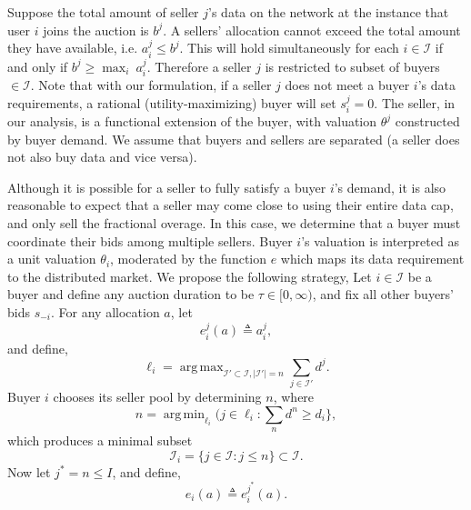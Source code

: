 \documentclass[12pt]{article}
\theoremstyle{definition}
\newcommand{\vs}{\varsigma}
\newcommand{\mcI}{\mathcal{I}}
\DeclareMathOperator*{\argmax}{arg\,max}
\DeclareMathOperator*{\argmin}{arg\,min}
\begin{document}
\begin{multicols}{2}
Suppose the total amount of seller $j$'s data on the network at the instance that
user $i$ joins the auction is $b^j$. 
A sellers' allocation cannot exceed the total amount they have available,
i.e. $a_i^j \le b^j$. This will hold simultaneously for each $i \in
\mcI$ if and only if $b^j \ge \max_i \ a_i^j$. Therefore a seller $j$ is
restricted to subset of buyers $\in\mcI$.
Note that with our formulation, if a seller $j$ does not meet a buyer $i$'s data requirements, a
rational (utility-maximizing) buyer will set $s_i^j = 0$. The seller, in our analysis, is a functional
extension of the buyer, with valuation $\theta^j$ constructed by buyer demand.
We assume that buyers and sellers are separated (a seller does not also buy
data and vice versa).

Although it is possible for a seller to fully satisfy a buyer $i$'s demand, it
is also reasonable to expect that a seller may come close to using their
entire data cap, and only sell the fractional overage. In this case, we
determine that a buyer must coordinate their bids among multiple sellers. 
Buyer $i$'s valuation is interpreted as a unit valuation $\theta_i$,
moderated by the function $e$ which maps its data requirement to the distributed market. 
We propose the following strategy,
{
\label{buyerstrategy}
Let $i\in\mcI$ be a buyer and define any auction duration
to be $\tau \in [0,\infty)$, and fix all other buyers' bids $s_{-i}$. 
For any allocation $a$, let
\begin{equation}\label{opt-out}
    e_i^j(a) \triangleq a_i^j,
\end{equation}
and define,
$$
    \ell_i =\argmax_{\mcI' \subset \mcI, \vert\mcI'\vert =
n}\sum_{j\in\mcI'} d^j.
$$
Buyer $i$ chooses its seller pool by determining $n$, where
\begin{equation}\label{buyercoordinate}
    n = \argmin_{\ell_i}(j \in \ell_i : \displaystyle\sum_{n} d^n
\ge d_i\rbrace,
\end{equation} 
which produces a minimal subset 
\begin{equation}\label{sellers}
    \mcI_i = \lbrace j \in \mcI : j \le n\rbrace \subset \mcI.
\end{equation} 
Now let $j^* = n \le I$, and define, 
\begin{equation}\label{opt-minallocation}
    e_i(a) \triangleq e_i^{j^*}(a).
\end{equation}
}
\end{multicols}
\end{document}
